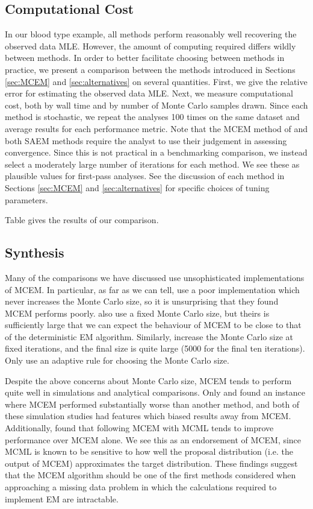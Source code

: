 \documentclass[11pt, oneside]{article}   	%
\begin{document}
\subsection{Computational Cost}
In our blood type example, all methods perform reasonably well recovering the observed data MLE. However, the amount of computing required differs wildly between methods. In order to better facilitate choosing between methods in practice, we present a comparison between the methods introduced in Sections \ref{sec:MCEM} and \ref{sec:alternatives} on several quantities. First, we give the relative error for estimating the observed data MLE. Next, we measure computational cost, both by wall time and by number of Monte Carlo samples drawn. Since each method is stochastic, we repeat the analyses 100 times on the same dataset and average results for each performance metric. Note that the MCEM method of \citet{Wei90} and both SAEM methods require the analyst to use their judgement in assessing convergence. Since this is not practical in a benchmarking comparison, we instead select a moderately large number of iterations for each method. We see these as plausible values for first-pass analyses. See the discussion of each method in Sections \ref{sec:MCEM} and \ref{sec:alternatives} for specific choices of tuning parameters.

Table  gives the results of our comparison.


\subsection{Synthesis}
Many of the comparisons we have discussed \citep{McC97, Gu98I,Jan03} use unsophisticated implementations of MCEM. In particular, as far as we can tell, \citet{Gu98I} use a poor implementation which never increases the Monte Carlo size, so it is unsurprising that they found MCEM performs poorly. \citet{Jan03} also use a fixed Monte Carlo size, but theirs is sufficiently large that we can expect the behaviour of MCEM to be close to that of the deterministic EM algorithm. Similarly, \citet{McC97} increase the Monte Carlo size at fixed iterations, and the final size is quite large (5000 for the final ten iterations). Only \citet{Boo99} use an adaptive rule for choosing the Monte Carlo size.

Despite the above concerns about Monte Carlo size, MCEM tends to perform quite well in simulations and analytical comparisons. Only \citet{Gu98I} and \citet{Boo01} found an instance where MCEM performed substantially worse than another method, and both of these simulation studies had features which biased results away from MCEM. Additionally, \citep{McC97} found that following MCEM with MCML tends to improve performance over MCEM alone. We see this as an endorsement of MCEM, since MCML is known to be sensitive to how well the proposal distribution (i.e. the output of MCEM) approximates the target distribution. These findings suggest that the MCEM algorithm should be one of the first methods considered when approaching a missing data problem in which the calculations required to implement EM are intractable.
\end{document}
